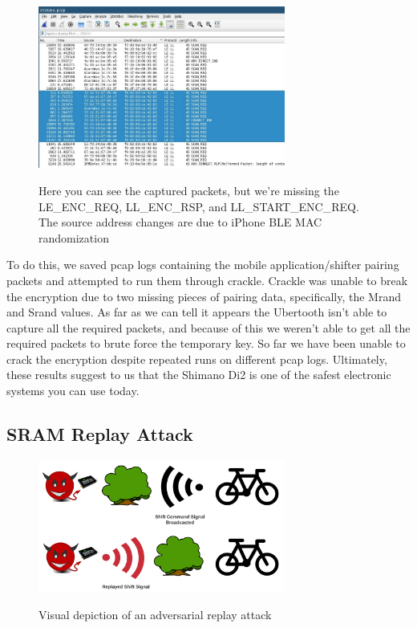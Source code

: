 \documentclass[letterpaper,twocolumn,10pt]{article}
\begin{document}
\begin{figure}[ht]
  \begin{center}
    \centering
    \includegraphics[width=230pt]{images/shimano-crackle.jpeg}
    \label{fig:crackle}
  \end{center}
  \caption{Here you can see the captured packets, but we're missing the LE\_ENC\_REQ, LL\_ENC\_RSP, and LL\_START\_ENC\_REQ. The source address changes are due to iPhone BLE MAC randomization}
\end{figure}

To do this, we saved pcap logs containing the mobile application/shifter pairing packets and attempted to run them through crackle. Crackle was unable to break the encryption due to two missing pieces of pairing data, specifically, the Mrand and Srand values. As far as we can tell it appears the Ubertooth isn't able to capture all the required packets, and because of this we weren't able to get all the required packets to brute force the temporary key. So far we have been unable to crack the encryption despite repeated runs on different pcap logs. Ultimately, these results suggest to us that the Shimano Di2 is one of the safest electronic systems you can use today.

\subsection{SRAM Replay Attack}

\begin{figure}[ht]
  \begin{center}
    \centering
    \includegraphics[width=230pt]{images/replay.png}
    \label{fig:Replay}
  \end{center}
  \caption{Visual depiction of an adversarial replay attack}
\end{figure}
\end{document}

